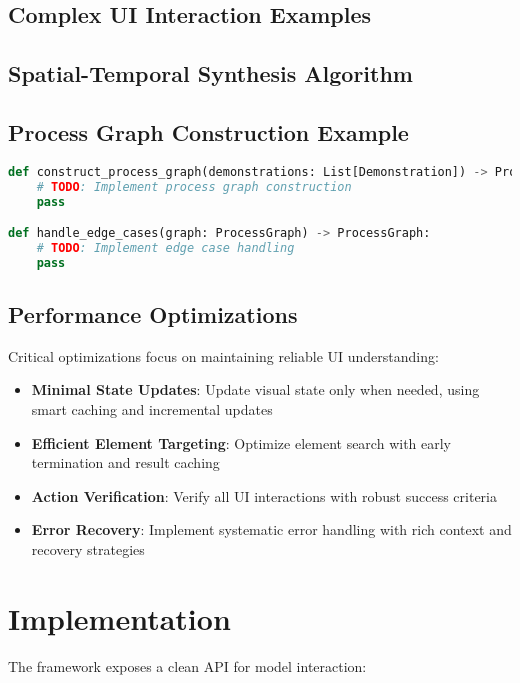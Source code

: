 \documentclass{article}
\begin{document}
\subsection{Complex UI Interaction Examples}

\subsection{Spatial-Temporal Synthesis Algorithm}

\subsection{Process Graph Construction Example}
\begin{lstlisting}[language=Python]
def construct_process_graph(demonstrations: List[Demonstration]) -> ProcessGraph:
    # TODO: Implement process graph construction
    pass

def handle_edge_cases(graph: ProcessGraph) -> ProcessGraph:
    # TODO: Implement edge case handling
    pass
\end{lstlisting}

\subsection{Performance Optimizations}
Critical optimizations focus on maintaining reliable UI understanding:

\begin{itemize}
    \item \textbf{Minimal State Updates}: Update visual state only when needed, using smart caching and incremental updates
    \item \textbf{Efficient Element Targeting}: Optimize element search with early termination and result caching
    \item \textbf{Action Verification}: Verify all UI interactions with robust success criteria
    \item \textbf{Error Recovery}: Implement systematic error handling with rich context and recovery strategies
\end{itemize}

\section{Implementation}
The framework exposes a clean API for model interaction:
\end{document}
